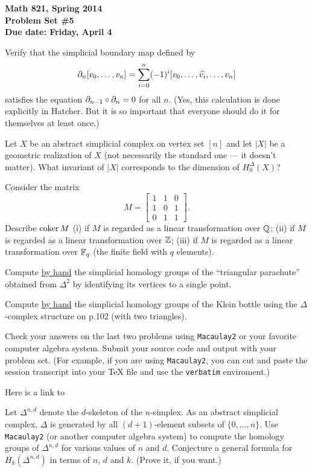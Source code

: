 

\thispagestyle{empty}
{\bf Math 821, Spring 2014\\
Problem Set \#5\\
Due date: Friday, April 4}

\vfill\prob Verify that the simplicial boundary map defined by
\[\partial_n[v_0,\dots,v_n] = \sum_{i=0}^n (-1)^i [v_0,\dots,\widehat{v_i},\dots,v_n]\]
satisfies the equation $\partial_{n-1}\circ\partial_n=0$ for all $n$.  (Yes, this
calculation is done explicitly in Hatcher.
But it is so important that everyone should do it for themselves at least once.)

\vfill\prob Let $X$ be an abstract simplicial complex on vertex set $[n]$ and let $|X|$ be a geometric realization of $X$
(not necessarily the standard one --- it doesn't matter).
What invariant of $|X|$ corresponds to the dimension of $H^\Delta_0(X)$? 

\vfill\prob Consider the matrix
$$M=\begin{bmatrix} 1&1&0\\1&0&1\\0&1&1\end{bmatrix}.$$
Describe $\operatorname{coker} M$
(i) if $M$ is regarded as a linear transformation over $\mathbb{Q}$;
(ii) if $M$ is regarded as a linear transformation over $\mathbb{Z}$;
(iii) if $M$ is regarded as a linear transformation over $\mathbb{F}_q$
(the finite field with $q$ elements).

\vfill\prob [Hatcher p.131 \#4]  Compute \underline{by hand} the simplicial homology groups of the ``triangular parachute'' obtained from $\Delta^2$ by identifying its vertices to a single point.

\vfill\prob [Hatcher p.131 \#5]  Compute \underline{by hand} the simplicial homology groups of the Klein bottle using the $\Delta$-complex structure on p.102 (with two triangles).

\vfill\prob Check your answers on the last two problems using {\tt Macaulay2} or your favorite computer algebra system.
Submit your source code and output with your problem set. (For example, if you are using {\tt Macaulay2}, you can cut and paste the session transcript into your TeX file and use the {\tt verbatim} enviroment.)

Here is a link to  \href{http://www.jlmartin.faculty.ku.edu/math821/Macaulay2.pdf}{}

\vfill\prob Let $\Delta^{n,d}$ denote the $d$-skeleton of the $n$-simplex.  As an abstract simplicial complex, $\Delta$ is generated by all $(d+1)$-element subsets of $\{0,\dots,n\}$.  Use {\tt Macaulay2} (or another computer algebra system) to compute the homology groups of $\Delta^{n,d}$ for various values of $n$ and $d$.  Conjecture a general formula for $H_k(\Delta^{n,d})$ in terms of $n$, $d$ and $k$.  (Prove it, if you want.)

